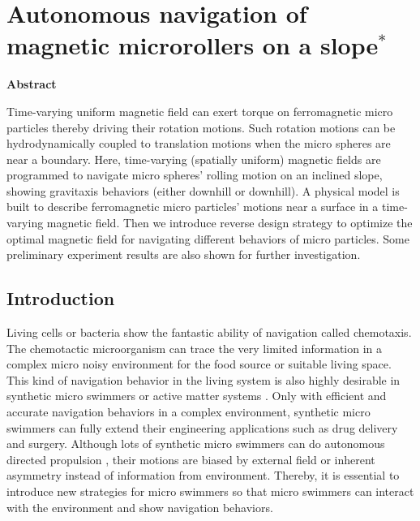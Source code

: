 \chapter{Autonomous navigation of magnetic microrollers on a slope$^{*}$} 
\begin{center}
\vspace*{1\baselineskip}
\textbf{Abstract}
\end{center}
Time-varying uniform magnetic field can exert torque on ferromagnetic micro particles thereby driving their rotation motions. Such rotation motions can be hydrodynamically coupled to translation motions when the micro spheres are near a boundary. Here, time-varying (spatially uniform) magnetic fields are  programmed to navigate micro spheres' rolling motion on an inclined slope, showing gravitaxis behaviors (either downhill or downhill). A physical model is  built  to describe ferromagnetic micro particles' motions near a surface in a time-varying magnetic field. Then we introduce reverse design strategy to optimize the optimal magnetic field for navigating different behaviors of micro particles. Some preliminary experiment results are also shown for further investigation. 
\section{Introduction}
Living cells or bacteria show the fantastic ability of navigation called chemotaxis\autocite{alon1999robustness,adler1975chemotaxis}. The chemotactic microorganism can trace the very limited information in  a complex micro noisy environment for the food source or suitable living space\autocite{keller1971model}. This kind of navigation behavior in the living system is also highly desirable in synthetic micro swimmers or active matter systems \autocite{patteson2016active}. Only with efficient and accurate navigation behaviors in a complex environment, synthetic micro swimmers can fully extend their engineering applications such as drug delivery and surgery\autocite{de2017micromotor,xu2018sperm}. Although lots of synthetic  micro swimmers can do autonomous directed propulsion \autocite{yan2016reconfiguring,lee2019directed,baker2019shape}, their motions are biased by  external field or inherent asymmetry instead of information from environment. Thereby, it is essential to introduce new strategies for micro swimmers so that micro swimmers can interact with the environment and show navigation behaviors.  

